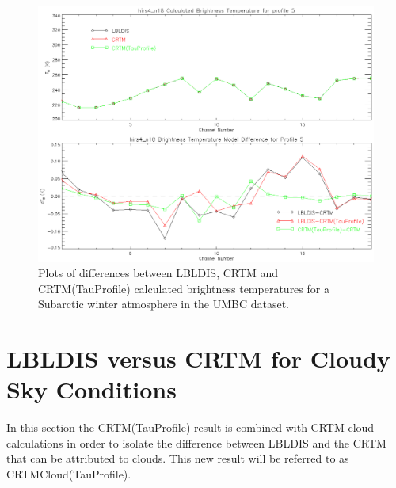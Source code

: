\begin{figure}[htp]
  \centering{}
  \includegraphics[scale=0.8]{./graphics/SubArc_Winter_05.eps}
  \caption{Plots of differences between LBLDIS, CRTM and CRTM(TauProfile) calculated brightness temperatures for
   a Subarctic winter atmosphere in the UMBC dataset.}
  \label{fig:Subarctic_Winter_Dep}
\end{figure}

\newpage{}

\section{LBLDIS versus CRTM for Cloudy Sky Conditions}

In this section the CRTM(TauProfile) result is combined with CRTM cloud calculations in order to isolate the difference between LBLDIS and 
the CRTM that can be attributed to clouds. This new result will be referred to as CRTM\textunderscore{}Cloud(TauProfile).

